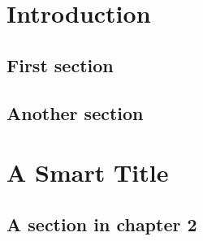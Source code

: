 \documentclass{harvard-thesis}
\begin{document}

\maketitle
\copyrightpage
\abstractpage
\tableofcontents
\dedicationpage
\authorlist
\acknowledgments





\chapter{Introduction}

\section{First section}

\section{Another section}


\chapter{A Smart Title}

\section{A section in chapter 2}


\end{document}
